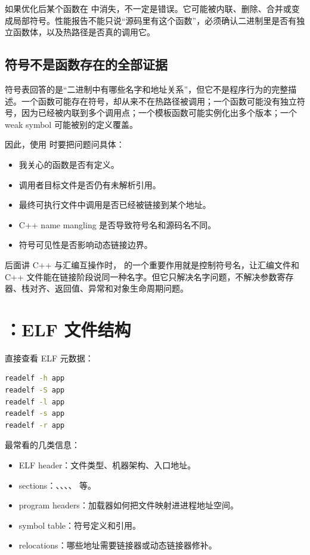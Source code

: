 如果优化后某个函数在  中消失，不一定是错误。它可能被内联、删除、合并或变成局部符号。性能报告不能只说“源码里有这个函数”，必须确认二进制里是否有独立函数体，以及热路径是否真的调用它。

\subsection{符号不是函数存在的全部证据}

符号表回答的是“二进制中有哪些名字和地址关系”，但它不是程序行为的完整描述。一个函数可能存在符号，却从来不在热路径被调用；一个函数可能没有独立符号，因为已经被内联到多个调用点；一个模板函数可能实例化出多个版本；一个 weak symbol 可能被别的定义覆盖。

因此，使用  时要把问题问具体：

\begin{itemize}
  \item 我关心的函数是否有定义。
  \item 调用者目标文件是否仍有未解析引用。
  \item 最终可执行文件中调用是否已经被链接到某个地址。
  \item C++ name mangling 是否导致符号名和源码名不同。
  \item 符号可见性是否影响动态链接边界。
\end{itemize}

后面讲 C++ 与汇编互操作时， 的一个重要作用就是控制符号名，让汇编文件和 C++ 文件能在链接阶段说同一种名字。但它只解决名字问题，不解决参数寄存器、栈对齐、返回值、异常和对象生命周期问题。

\section{：ELF 文件结构}

 直接查看 ELF 元数据：

\begin{lstlisting}[language=bash]
readelf -h app
readelf -S app
readelf -l app
readelf -s app
readelf -r app
\end{lstlisting}

最常看的几类信息：

\begin{itemize}
  \item ELF header：文件类型、机器架构、入口地址。
  \item sections：、、、、 等。
  \item program headers：加载器如何把文件映射进进程地址空间。
  \item symbol table：符号定义和引用。
  \item relocations：哪些地址需要链接器或动态链接器修补。
\end{itemize}

